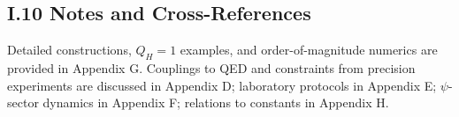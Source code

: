 \subsection*{I.10 Notes and Cross-References}
Detailed constructions, $Q_H{=}1$ examples, and order-of-magnitude numerics are provided in Appendix G. 
Couplings to QED and constraints from precision experiments are discussed in Appendix D; laboratory protocols in Appendix E; $\psi$-sector dynamics in Appendix F; relations to constants in Appendix H.
